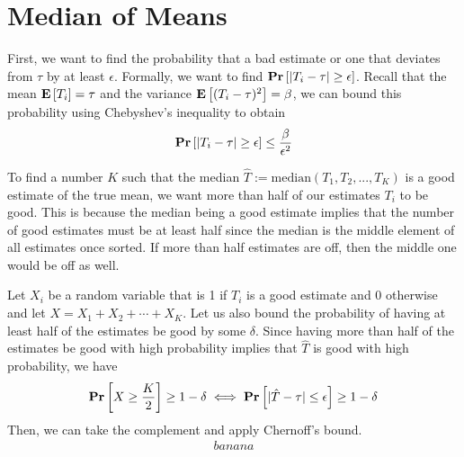 \chapter{Median of Means}

First, we want to find the probability that a bad estimate or one that deviates from $\tau$ by at least $\epsilon$. Formally, we want to find $\mathbf{Pr}\left[|T_i - \tau| \geq \epsilon\right]$. Recall that the mean $\mathbf{E}\left[T_i\right] = \tau$ and the variance $\mathbf{E}\left[(T_i - \tau)^2\right] = \beta$, we can bound this probability using Chebyshev's inequality to obtain
\[ \mathbf{Pr}\left[|T_i - \tau| \geq \epsilon\right] \leq \frac{\beta}{\epsilon^2} \]

To find a number $K$ such that the median $\hat{T} := \text{median}(T_1, T_2, ..., T_K)$ is a good estimate of the true mean, we want more than half of our estimates $T_i$ to be good. This is because the median being a good estimate implies that the number of good estimates must be at least half since the median is the middle element of all estimates once sorted. If more than half estimates are off, then the middle one would be off as well.

Let $X_i$ be a random variable that is 1 if $T_i$ is a good estimate and 0 otherwise and let $X = X_1 + X_2 + \cdots + X_K$. Let us also bound the probability of having at least half of the estimates be good by some $\delta$. Since having more than half of the estimates be good with high probability implies that $\hat{T}$ is good with high probability, we have
\[ \mathbf{Pr}\left[X \geq \frac{K}{2}\right] \geq 1 - \delta \iff \mathbf{Pr}\left[|\hat{T} - \tau| \leq \epsilon\right] \geq 1 - \delta \]
Then, we can take the complement and apply Chernoff's bound.
\begin{equation*}
\begin{aligned}
	banana
\end{aligned}
\end{equation*}
